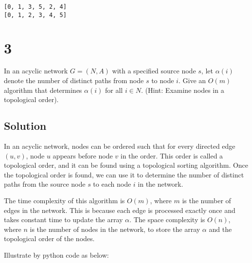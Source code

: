\documentclass[11pt]{article}
\begin{document}
    \begin{Verbatim}[commandchars=\\\{\}]
[0, 1, 3, 5, 2, 4]
[0, 1, 2, 3, 4, 5]
    \end{Verbatim}

    \hypertarget{section}{%
\section{3}\label{section}}

In an acyclic network \(G = (N, A)\) with a specified source node \(s\),
let \(\alpha(i)\) denote the number of distinct paths from node \(s\) to
node \(i\). Give an \(O(m)\) algorithm that determines \(\alpha(i)\) for
all \(i \in N\). (Hint: Examine nodes in a topological order).

\hypertarget{solution}{%
\subsection{Solution}\label{solution}}

In an acyclic network, nodes can be ordered such that for every directed
edge \((u, v)\), node \(u\) appears before node \(v\) in the order. This
order is called a topological order, and it can be found using a
topological sorting algorithm. Once the topological order is found, we
can use it to determine the number of distinct paths from the source
node \(s\) to each node \(i\) in the network.

The time complexity of this algorithm is \(O(m)\), where \(m\) is the
number of edges in the network. This is because each edge is processed
exactly once and takes constant time to update the array \(\alpha\). The
space complexity is \(O(n)\), where \(n\) is the number of nodes in the
network, to store the array \(\alpha\) and the topological order of the
nodes.

Illustrate by python code as below:
\end{document}
